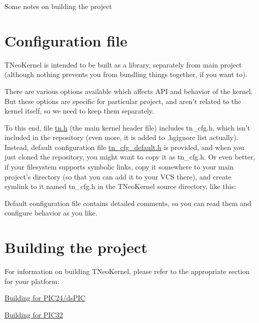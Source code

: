 Some notes on building the project\hypertarget{building_configuration_file}{}\section{Configuration file}\label{building_configuration_file}
T\+Neo\+Kernel is intended to be built as a library, separately from main project (although nothing prevents you from bundling things together, if you want to).

There are various options available which affects A\+P\+I and behavior of the kernel. But these options are specific for particular project, and aren't related to the kernel itself, so we need to keep them separately.

To this end, file {\ttfamily \hyperlink{tn_8h}{tn.\+h}} (the main kernel header file) includes {\ttfamily tn\+\_\+cfg.\+h}, which isn't included in the repository (even more, it is added to {\ttfamily .hgignore} list actually). Instead, default configuration file {\ttfamily \hyperlink{tn__cfg__default_8h}{tn\+\_\+cfg\+\_\+default.\+h}} is provided, and when you just cloned the repository, you might want to copy it as {\ttfamily tn\+\_\+cfg.\+h}. Or even better, if your filesystem supports symbolic links, copy it somewhere to your main project's directory (so that you can add it to your V\+C\+S there), and create symlink to it named {\ttfamily tn\+\_\+cfg.\+h} in the T\+Neo\+Kernel source directory, like this\+: 


Default configuration file contains detailed comments, so you can read them and configure behavior as you like.\hypertarget{building_building_generic}{}\section{Building the project}\label{building_building_generic}
For information on building T\+Neo\+Kernel, please refer to the appropriate section for your platform\+:


\begin{DoxyItemize}
\item \hyperlink{pic24_details_pic24_building}{Building for P\+I\+C24/ds\+P\+I\+C}
\item \hyperlink{pic32_details_pic32_building}{Building for P\+I\+C32} 
\end{DoxyItemize}